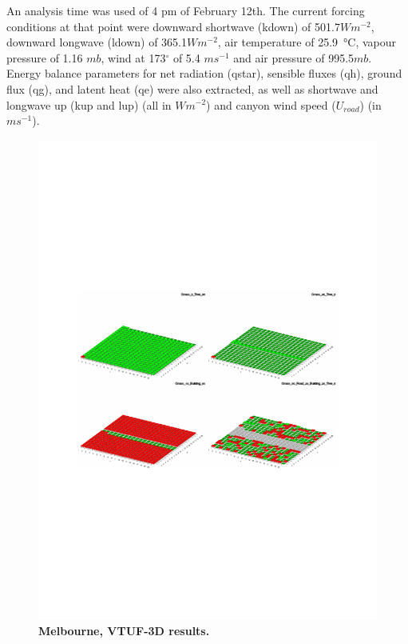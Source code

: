 \documentclass[final,3p,times,authoryear]{elsarticle}
\begin{document}
An analysis time was used of  4 pm of February 12th. The current forcing conditions at that point were downward shortwave (\gls{kdown}) of 501.7$Wm^{-2}$, downward longwave (\gls{ldown}) of 365.1$Wm^{-2}$, air temperature of 25.9\SI{}{\degreeCelsius}, vapour pressure of 1.16 $mb$, wind at 173$^{\circ}$ of 5.4 $ms^{-1}$ and air pressure of 995.5$mb$. Energy balance parameters for net radiation (\gls{qstar}), sensible fluxes (\gls{qh}), ground flux (\gls{qg}), and latent heat (\gls{qe}) were also extracted, as well as shortwave and longwave up (\gls{kup} and \gls{lup}) (all in $Wm^{-2}$) and canyon wind speed ($U_{road}$) (in $ms^{-1}$).

\begin{figure}
\centering
\includegraphics[page=2,trim={75 240 60 240},clip,scale=0.55]{Figures/PresentationImages.pdf}
\caption{\bf Melbourne, VTUF-3D results.}
 \label{fig:vtufresults}
\end{figure} 
\end{document}
